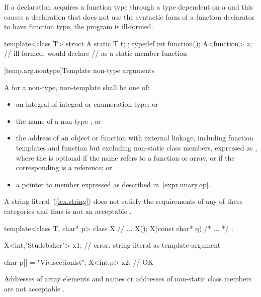 \pnum
If a declaration acquires a function type through a type dependent on a
and this causes a declaration that does not use the
syntactic form of a function declarator to have function type,
the program is ill-formed.
\enterexample

\begin{codeblock}
template<class T> struct A {
	static T t;
};
typedef int function();
A<function> a;                  // ill-formed: would declare 
                                // as a static member function
\end{codeblock}
\exitexampleb

[temp.arg.nontype]{Template non-type arguments}

\pnum
A
for a non-type, non-template
shall be one of:
\begin{itemize}
\item
an integral  of integral or enumeration type;
or
\item
the name of a non-type
;
or
\item
the address of an object
or function with external linkage,
including function templates and function
but
excluding non-static class members, expressed as
\tcode{\&}
, where
the
\tcode{\&}
is optional if the name refers to a function or
array, or if the corresponding
is a reference;
or
\item
a pointer to member expressed as described in~\ref{expr.unary.op}.
\end{itemize}

\pnum
\enternote
A string literal~(\ref{lex.string})
does not satisfy the requirements of any of these
categories and thus is not an acceptable
.
\enterexample

\begin{codeblock}
template<class T, char* p> class X {
	// ...
	X();
	X(const char* q) { /* ... */ }
};

X<int,"Studebaker"> x1;		// error: string literal as template-argument

char p[] = "Vivisectionist";
X<int,p> x2;                    // OK
\end{codeblock}
\exitexampleb
\exitnoteb

\pnum
\enternote
Addresses of array elements and names or addresses of non-static class
members are not acceptable
.
\enterexample

